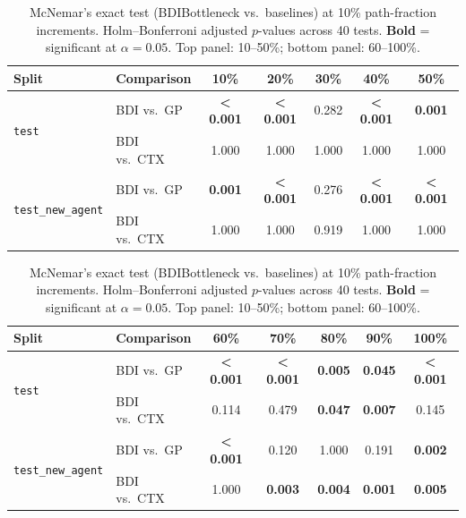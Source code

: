 \begin{table}[t]
  \centering
  \scriptsize
  \setlength{\tabcolsep}{4pt}
  \caption{McNemar's exact test (BDIBottleneck vs.\ baselines) at 10\% path-fraction increments.  Holm--Bonferroni adjusted $p$-values across 40 tests.  \textbf{Bold} = significant at $\alpha=0.05$.  Top panel: 10--50\%; bottom panel: 60--100\%.}
  \label{tab:mcnemar_results}
  \begin{tabular}{llccccc}
    \toprule
    Split & Comparison & 10\% & 20\% & 30\% & 40\% & 50\% \\
    \midrule
    \multirow{2}{*}{\texttt{test}} & BDI vs.\ GP & \textbf{< 0.001} & \textbf{< 0.001} & 0.282 & \textbf{< 0.001} & \textbf{0.001} \\
     & BDI vs.\ CTX & 1.000 & 1.000 & 1.000 & 1.000 & 1.000 \\
    \midrule
    \multirow{2}{*}{\texttt{test\_new\_agent}} & BDI vs.\ GP & \textbf{0.001} & \textbf{< 0.001} & 0.276 & \textbf{< 0.001} & \textbf{< 0.001} \\
     & BDI vs.\ CTX & 1.000 & 1.000 & 0.919 & 1.000 & 1.000 \\
    \bottomrule
  \end{tabular}
  \vspace{4pt}
  \begin{tabular}{llccccc}
    \toprule
    Split & Comparison & 60\% & 70\% & 80\% & 90\% & 100\% \\
    \midrule
    \multirow{2}{*}{\texttt{test}} & BDI vs.\ GP & \textbf{< 0.001} & \textbf{< 0.001} & \textbf{0.005} & \textbf{0.045} & \textbf{< 0.001} \\
     & BDI vs.\ CTX & 0.114 & 0.479 & \textbf{0.047} & \textbf{0.007} & 0.145 \\
    \midrule
    \multirow{2}{*}{\texttt{test\_new\_agent}} & BDI vs.\ GP & \textbf{< 0.001} & 0.120 & 1.000 & 0.191 & \textbf{0.002} \\
     & BDI vs.\ CTX & 1.000 & \textbf{0.003} & \textbf{0.004} & \textbf{0.001} & \textbf{0.005} \\
    \bottomrule
  \end{tabular}
\end{table}